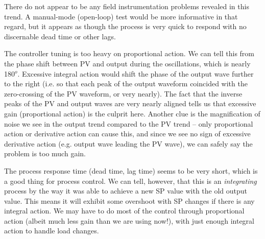 \vskip 10pt

There do not appear to be any field instrumentation problems revealed in this trend.  A manual-mode (open-loop) test would be more informative in that regard, but it appears as though the process is very quick to respond with no discernable dead time or other lags.

\vskip 10pt
  
The controller tuning is too heavy on proportional action.  We can tell this from the phase shift between PV and output during the oscillations, which is nearly 180$^{o}$.  Excessive integral action would shift the phase of the output wave further to the right (i.e. so that each peak of the output waveform coincided with the zero-crossing of the PV waveform, or very nearly).  The fact that the inverse peaks of the PV and output waves are very nearly aligned tells us that excessive gain (proportional action) is the culprit here.  Another clue is the magnification of noise we see in the output trend compared to the PV trend -- only proportional action or derivative action can cause this, and since we see no sign of excessive derivative action (e.g. output wave leading the PV wave), we can safely say the problem is too much gain.

\vskip 10pt

The process response time (dead time, lag time) seems to be very short, which is a good thing for process control.  We can tell, however, that this is an {\it integrating} process by the way it was able to achieve a new SP value with the old output value.  This means it will exhibit some overshoot with SP changes if there is any integral action.  We may have to do most of the control through proportional action (albeit much less gain than we are using now!), with just enough integral action to handle load changes.











